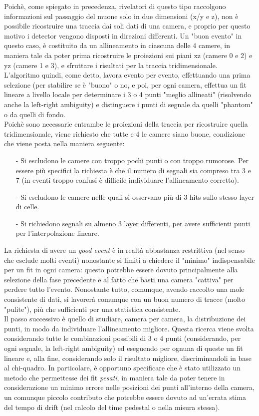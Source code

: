 \documentclass[a4paper,11pt]{book}
\begin{document}
Poichè, come spiegato in precedenza, rivelatori di questo tipo raccolgono informazioni sul passaggio del muone solo in due dimensioni (x/y e z), non è possibile ricostruire una traccia dai soli dati di una camera, e proprio per questo motivo i detector vengono disposti in direzioni differenti. Un "buon evento" in questo caso, è costituito da un allineamento in ciascuna delle 4 camere, in maniera tale da poter prima ricostruire le proiezioni sui piani xz (camere 0 e 2) e yz (camere 1 e 3), e sfruttare i risultati per la traccia tridimensionale.\\
L'algoritmo quindi, come detto, lavora evento per evento, effettuando una prima selezione (per stabilire se è "buono" o no, e poi, per ogni camera, effettua un fit lineare a livello locale per determinare i 3 o 4 punti "meglio allineati" (risolvendo anche la left-right ambiguity) e distinguere i punti di segnale da quelli "phantom" o da quelli di fondo.\\
Poichè sono necessarie entrambe le proiezioni della traccia per ricostruire quella tridimensionale, viene richiesto che tutte e 4 le camere siano buone, condizione che viene posta nella maniera seguente:
\begin{itemize}
\item[-] Si escludono le camere con troppo pochi punti o con troppo rumorose. Per essere più specifici la richiesta è che il numero di segnali sia compreso tra 3 e 7 (in eventi troppo confusi è difficile individuare l'allineamento corretto).
\item[-] Si escludono le camere nelle quali si osservano più di 3 hits sullo stesso layer di celle.
\item[-] Si richiedono segnali su almeno 3 layer differenti, per avere sufficienti punti per l'interpolazione lineare.
\end{itemize}
La richiesta di avere un \textit{good event} è in realtà abbastanza restrittiva (nel senso che esclude molti eventi) nonostante si limiti a chiedere il "minimo" indispensabile per un fit in ogni camera: questo potrebbe essere dovuto principalmente alla selezione della fase precedente e al fatto che basti una camera "cattiva" per perdere tutto l'evento. Nonostante tutto, comunque, avendo raccolto una mole consistente di dati, si lavorerà comunque con un buon numero di tracce (molto "pulite"), più che sufficienti per una statistica consistente.\\
Il passo successivo è quello di studiare, camera per camera, la distribuzione dei punti, in modo da individuare l'allineamento migliore. Questa ricerca viene svolta considerando tutte le combinazioni possibili di 3 o 4 punti (considerando, per ogni segnale, la left-right ambiguity) ed eseguendo per ognuna di queste un fit lineare e, alla fine, considerando solo il risultato migliore, discriminandoli in base al chi-quadro. In particolare, è opportuno specificare che è stato utilizzato un metodo che permettesse dei fit \textit{pesati}, in maniera tale da poter tenere in considerazione un minimo errore nelle posizioni dei punti all'interno della camera, un comunque piccolo contributo che potrebbe essere dovuto ad un'errata stima del tempo di drift (nel calcolo del time pedestal o nella misura stessa).\\
\end{document}
